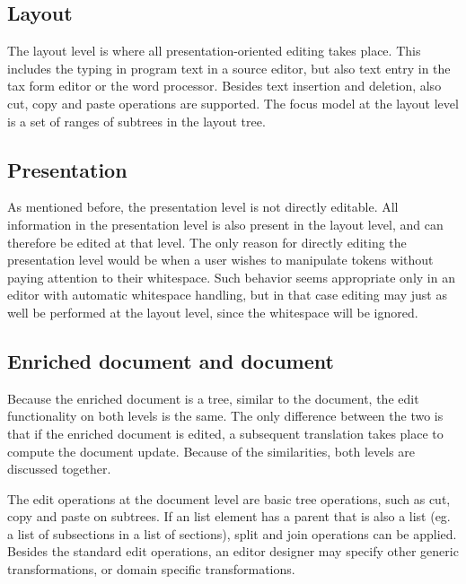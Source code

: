 
%																
\subsection{Layout}

The layout level is where all presentation-oriented editing takes place. This includes the typing in program text in a source editor, but also text entry in the tax form editor or the word processor. Besides text insertion and deletion, also cut, copy and paste operations are supported. The focus model at the layout level is a set of ranges of subtrees in the layout tree.
 
 
%																
\subsection{Presentation}

As mentioned before, the presentation level is not directly editable. All information in the presentation level is also present in the layout level, and can therefore be edited at that level. The only reason for directly editing the presentation level would be when a user wishes to manipulate tokens without paying attention to their whitespace. Such behavior seems appropriate only in an editor with automatic whitespace handling, but in that case editing may just as well be performed at the layout level, since the whitespace will be ignored. 
 
 
%																
\subsection{Enriched document and document}

Because the enriched document is a tree, similar to the document, the edit functionality on both levels is the same. The only difference between the two is that if the enriched document is edited, a subsequent translation takes place to compute the document update. Because of the similarities, both levels are discussed together.

The edit operations at the document level are basic tree operations, such as cut, copy and paste on subtrees. If an list element has a parent that is also a list (eg. a list of subsections in a list of sections), split and join operations can be applied. Besides the standard edit operations, an editor designer may specify other generic transformations, or domain specific transformations. 

